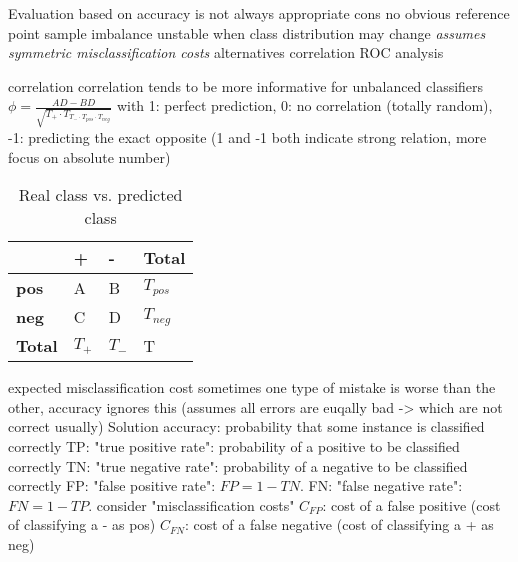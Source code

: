 \begin{outline}
    \1 Evaluation based on accuracy is not always appropriate
    \1 cons
        \2 no obvious reference point
            \3 sample imbalance
        \2 unstable when class distribution may change
        \2 \emph{assumes symmetric misclassification costs}
    \1 alternatives
        \2 correlation
        \2 ROC analysis
\end{outline}

\begin{outline}
    \1 correlation
        \2 correlation tends to be more informative for unbalanced classifiers
        \2 $\phi = \frac{AD - BD}{\sqrt{T_{+} \cdot T_{T_{-} \cdot T_{pos} \cdot T_{neg}}}}$ with 1: perfect prediction, 0: no correlation (totally random), -1: predicting the exact opposite (1 and -1 both indicate strong relation, more focus on absolute number)
\end{outline}

\begin{table}[htbp]\footnotesize
    \centering
    \caption{Real class vs. predicted class}
    \begin{tabularx}{\textwidth}{X|X|X|X}
    \toprule
    \textbf{ }&\textbf{+}&\textbf{-}&\textbf{Total} \\
    \hline
    \textbf{pos}&A&B&$T_{pos}$ \\
    \hline
    \textbf{neg}&C&D&$T_{neg}$ \\
    \hline
    \textbf{Total}&$T_{+}$&$T_{-}$&T \\
    \bottomrule
    \end{tabularx}
    \label{tab:real_predicted_class_table}
\end{table}

\begin{outline}
    \1 expected misclassification cost
        \2 sometimes one type of mistake is worse than the other, accuracy ignores this (assumes all errors are euqally bad -> which are not correct usually)
        \2 Solution
            \3 accuracy: probability that some instance is classified correctly
            \3 TP: "true positive rate": probability of a positive to be classified correctly
            \3 TN: "true negative rate": probability of a negative to be classified correctly
            \3 FP: "false positive rate": $FP = 1 - TN$. 
            \3 FN: "false negative rate": $FN = 1 - TP$.
        \2 consider "misclassification costs"
            \3 $C_{FP}$: cost of a false positive (cost of classifying a - as pos)
            \3 $C_{FN}$: cost of a false negative (cost of classifying a + as neg)

\end{outline}



